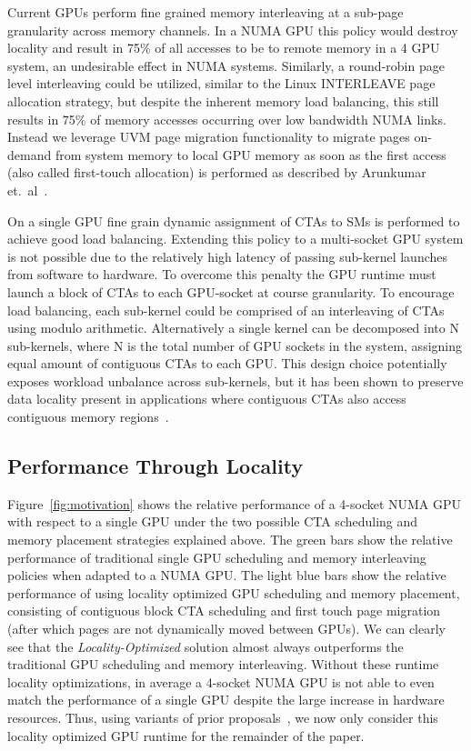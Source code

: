 Current GPUs perform fine grained memory interleaving at a sub-page granularity 
across memory channels.  In a NUMA GPU this policy would destroy locality and 
result in 75\% of all accesses to be to remote memory in a 4 GPU system, an 
undesirable effect in NUMA systems.  Similarly, a round-robin page level 
interleaving could be utilized, similar to the Linux INTERLEAVE page allocation 
strategy, but despite the inherent memory load balancing, this still results in 
75\% of memory accesses occurring over low bandwidth NUMA links. Instead we 
leverage UVM page migration functionality to migrate pages on-demand from system 
memory to local GPU memory as soon as the first access (also called first-touch 
allocation) is performed as described by Arunkumar et.~al~\cite{Arunkumar2017}.

On a single GPU fine grain dynamic assignment of CTAs to SMs is performed to 
achieve good load balancing.  Extending this policy to a multi-socket GPU 
system is not possible due to the relatively high latency of passing sub-kernel 
launches from software to hardware.  To overcome this penalty the GPU runtime 
must launch a block of CTAs to each GPU-socket at course granularity.  To 
encourage load balancing, each sub-kernel could be comprised of an interleaving 
of CTAs using modulo arithmetic.  Alternatively a single kernel can be 
decomposed into N sub-kernels, where N is the total number of GPU sockets in 
the system, assigning equal amount of contiguous CTAs to each GPU.  This design 
choice potentially exposes workload unbalance across sub-kernels, but it has 
been shown to preserve data locality present in applications where contiguous 
CTAs also access contiguous memory regions~\cite{Cabezas2015,Arunkumar2017}.

\vspace{-.1in}
\subsection{Performance Through Locality} 

Figure~\ref{fig:motivation} shows the relative performance of a 4-socket NUMA 
GPU with respect to a single GPU under the two possible CTA scheduling and 
memory placement strategies explained above.  The green bars show the 
relative performance of traditional single GPU scheduling and memory 
interleaving policies when adapted to a NUMA GPU. The light blue bars
show the relative performance of using locality optimized GPU scheduling and 
memory placement, consisting of contiguous block CTA scheduling and first touch 
page migration (after which pages are not dynamically moved between GPUs). 
We can clearly see that the \textit{Locality-Optimized} 
solution almost always outperforms the traditional GPU scheduling and memory 
interleaving.  Without these runtime locality optimizations, in average a 4-socket NUMA 
GPU is not able to even match the performance of a single GPU despite the large 
increase in hardware resources.  Thus, using variants of prior 
proposals~\cite{Cabezas2015,Arunkumar2017}, we now only consider this locality 
optimized GPU runtime for the remainder of the paper.

